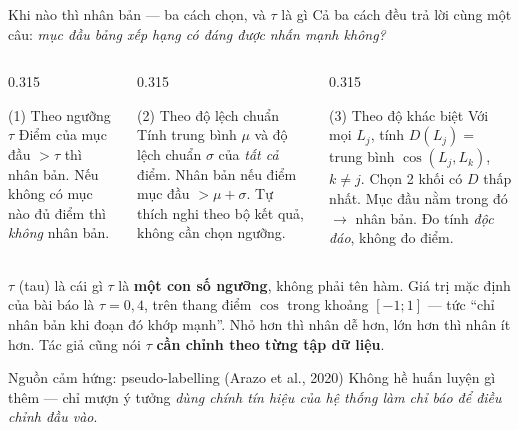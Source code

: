 \documentclass[aspectratio=169,10pt]{beamer}
\begin{document}
\begin{frame}{Khi nào thì nhân bản --- ba cách chọn, và $\tau$ là gì}
  {\footnotesize Cả ba cách đều trả lời cùng một câu: \emph{mục đầu bảng xếp hạng có
  đáng được nhấn mạnh không?}}
  \begin{columns}[T]
    \begin{column}{0.315\textwidth}
      \begin{block}{\small (1) Theo ngưỡng $\tau$}
        \footnotesize Điểm của mục đầu $> \tau$ thì nhân bản.
        \vspace{0.25em}
        {\footnotesize Nếu không có mục nào đủ điểm thì \emph{không} nhân bản.}
      \end{block}
    \end{column}
    \begin{column}{0.315\textwidth}
      \begin{block}{\small (2) Theo độ lệch chuẩn}
        \footnotesize Tính trung bình $\mu$ và độ lệch chuẩn $\sigma$ của \emph{tất cả} điểm.
        Nhân bản nếu điểm mục đầu $> \mu + \sigma$.
        \vspace{0.25em}
        {\footnotesize Tự thích nghi theo bộ kết quả, không cần chọn ngưỡng.}
      \end{block}
    \end{column}
    \begin{column}{0.315\textwidth}
      \begin{block}{\small (3) Theo độ khác biệt}
        \footnotesize Với mọi $L_j$, tính $D(L_j) = $ trung bình $\cos(L_j, L_k)$, $k \neq j$.
        Chọn 2 khối có $D$ thấp nhất. Mục đầu nằm trong đó $\rightarrow$ nhân bản.
        \vspace{0.25em}
        {\footnotesize Đo tính \emph{độc đáo}, không đo điểm.}
      \end{block}
    \end{column}
  \end{columns}
  \begin{alertblock}{\small $\tau$ (tau) là cái gì}
    \footnotesize $\tau$ là \textbf{một con số ngưỡng}, không phải tên hàm. Giá trị mặc định
    của bài báo là $\tau = 0{,}4$, trên thang điểm $\cos$ trong khoảng $[-1; 1]$ ---
    tức ``chỉ nhân bản khi đoạn đó khớp mạnh''. Nhỏ hơn thì nhân dễ hơn, lớn hơn thì nhân ít hơn.
    Tác giả cũng nói $\tau$ \textbf{cần chỉnh theo từng tập dữ liệu}.
  \end{alertblock}
  \begin{block}{\small Nguồn cảm hứng: pseudo-labelling (Arazo et al., 2020)}
    \footnotesize Không hề huấn luyện gì thêm --- chỉ mượn ý tưởng \emph{dùng chính tín hiệu của
    hệ thống làm chỉ báo để điều chỉnh đầu vào}.
  \end{block}
\end{frame}
\end{document}
